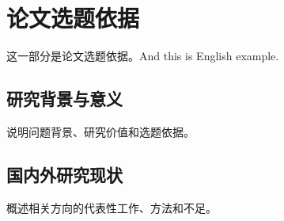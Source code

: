 \section{论文选题依据}
这一部分是论文选题依据。And this is English example.
\subsection{研究背景与意义}
说明问题背景、研究价值和选题依据\cite{guo2025deepseek}。

\subsection{国内外研究现状}
概述相关方向的代表性工作、方法和不足。
